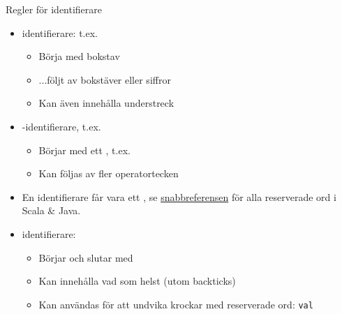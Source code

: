 \begin{Slide}{Regler för identifierare}
\begin{itemize}
\item {} identifierare: t.ex. 
\begin{itemize}
\item Börja med bokstav
\item ...följt av bokstäver eller siffror
\item Kan även innehålla understreck
\end{itemize}

\item {}-identifierare, t.ex. \code{+:}
\begin{itemize}
\item Börjar med ett , t.ex. 
\item Kan följas av fler operatortecken
\end{itemize}


\item En identifierare får  vara ett , se \href{http://cs.lth.se/pgk/quickref}{snabbreferensen} för alla reserverade ord i Scala \& Java.

\item {} identifierare: 
\begin{itemize}
\item Börjar och slutar med   
\item Kan innehålla vad som helst (utom backticks)
\item Kan användas för att undvika krockar med reserverade ord: \texttt{val}
\end{itemize}

\end{itemize}
\end{Slide}



